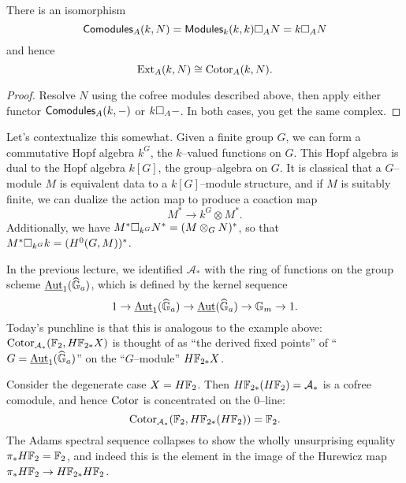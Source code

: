 \begin{corollary}
There is an isomorphism \[\mathsf{Comodules}_A(k, N) = \mathsf{Modules}_k(k, k) \square_A N = k \square_A N\] and hence \[\operatorname{Ext}_A(k, N) \cong \operatorname{Cotor}_A(k, N).\]
\end{corollary}
\begin{proof}
Resolve $N$ using the cofree modules described above, then apply either functor $\mathsf{Comodules}_A(k, -)$ or $k \square_A -$.  In both cases, you get the same complex.
\end{proof}

\begin{example}\label{HopfAlgebrasFromFiniteGroups}
Let's contextualize this somewhat.  Given a finite group $G$, we can form a commutative Hopf algebra $k^G$, the $k$--valued functions on $G$.  This Hopf algebra is dual to the Hopf algebra $k[G]$, the group--algebra on $G$.  It is classical that a $G$--module $M$ is equivalent data to a $k[G]$--module structure, and if $M$ is suitably finite, we can dualize the action map to produce a coaction map \[M^* \to k^G \otimes M^*.\]  Additionally, we have $M^* \square_{k^G} N^* = (M \otimes_G N)^*$, so that $M^* \square_{k^G} k = (H^0 (G,M))^*$.
\end{example}

\begin{example}\label{HF2HomologyIsValuedInAutGaEquivarModules}
In the previous lecture, we identified $\mathcal A_*$ with the ring of functions on the group scheme $\operatorname{\underline{\smash{\operatorname{Aut}}}}_1(\widehat{\mathbb G}_a)$, which is defined by the kernel sequence \[1 \to \operatorname{\underline{\smash{\operatorname{Aut}}}}_1(\widehat{\mathbb G}_a) \to \operatorname{\underline{\smash{\operatorname{Aut}}}}(\widehat{\mathbb G}_a) \to \mathbb G_m \to 1.\]    Today's punchline is that this is analogous to the example above: $\operatorname{Cotor}_{\mathcal A_*}(\mathbb F_2, H\mathbb F_{2*} X)$ is thought of as ``the derived fixed points'' of ``$G = \operatorname{\underline{\smash{\operatorname{Aut}}}}_1(\widehat{\mathbb G}_a)$'' on the ``$G$--module'' $H\mathbb F_{2*} X$.  
\end{example}

\begin{example}
Consider the degenerate case $X = H\mathbb F_2$.  Then $H\mathbb F_{2*}(H\mathbb F_2) = \mathcal A_*$ is a cofree comodule, and hence $\operatorname{Cotor}$ is concentrated on the $0$--line: \[\operatorname{Cotor}_{\mathcal A_*}(\mathbb F_2, H\mathbb F_{2*}(H\mathbb F_2)) = \mathbb F_2.\]  The Adams spectral sequence collapses to show the wholly unsurprising equality $\pi_* H\mathbb F_2 = \mathbb F_2$, and indeed this is the element in the image of the Hurewicz map $\pi_* H\mathbb F_2 \to H\mathbb F_{2*} H\mathbb F_2$.
\end{example}

